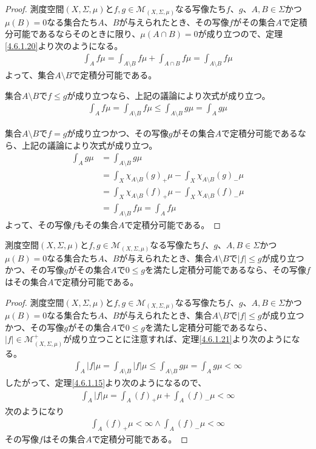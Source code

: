\documentclass[dvipdfmx]{jsarticle}
\begin{document}
\begin{proof}
測度空間$(X,\varSigma,\mu)$と$f,g \in \mathcal{M}_{(X,\varSigma,\mu)}$なる写像たち$f$、$g$、$A,B \in \varSigma$かつ$\mu(B) = 0$なる集合たち$A$、$B$が与えられたとき、その写像$f$がその集合$A$で定積分可能であるならそのときに限り、$\mu(A \cap B) = 0$が成り立つので、定理\ref{4.6.1.20}より次のようになる。
\begin{align*}
\int_{A} {f\mu} = \int_{A \setminus B} {f\mu} + \int_{A \cap B} {f\mu} = \int_{A \setminus B} {f\mu}
\end{align*}
よって、集合$A \setminus B$で定積分可能である。\par
集合$A \setminus B$で$f \leq g$が成り立つなら、上記の議論により次式が成り立つ。
\begin{align*}
\int_{A} {f\mu} = \int_{A \setminus B} {f\mu} \leq \int_{A \setminus B} {g\mu} = \int_{A} {g\mu}
\end{align*}\par
集合$A \setminus B$で$f = g$が成り立つかつ、その写像$g$がその集合$A$で定積分可能であるなら、上記の議論により次式が成り立つ。
\begin{align*}
\int_{A} {g\mu} &= \int_{A \setminus B} {g\mu}\\
&= \int_{X} {\chi_{A \setminus B}(g)_{+}\mu} - \int_{X} {\chi_{A \setminus B}(g)_{-}\mu}\\
&= \int_{X} {\chi_{A \setminus B}(f)_{+}\mu} - \int_{X} {\chi_{A \setminus B}(f)_{-}\mu}\\
&= \int_{A \setminus B} {f\mu} = \int_{A} {f\mu}
\end{align*}
よって、その写像$f$もその集合$A$で定積分可能である。
\end{proof}
\begin{thm}\label{4.6.1.22}
測度空間$(X,\varSigma,\mu)$と$f,g \in \mathcal{M}_{(X,\varSigma,\mu)}$なる写像たち$f$、$g$、$A,B \in \varSigma$かつ$\mu(B) = 0$なる集合たち$A$、$B$が与えられたとき、集合$A \setminus B$で$|f| \leq g$が成り立つかつ、その写像$g$がその集合$A$で$0 \leq g$を満たし定積分可能であるなら、その写像$f$はその集合$A$で定積分可能である。
\end{thm}
\begin{proof}
測度空間$(X,\varSigma,\mu)$と$f,g \in \mathcal{M}_{(X,\varSigma,\mu)}$なる写像たち$f$、$g$、$A,B \in \varSigma$かつ$\mu(B) = 0$なる集合たち$A$、$B$が与えられたとき、集合$A \setminus B$で$|f| \leq g$が成り立つかつ、その写像$g$がその集合$A$で$0 \leq g$を満たし定積分可能であるなら、$|f| \in \mathcal{M}_{(X,\varSigma,\mu)}^{+}$が成り立つことに注意すれば、定理\ref{4.6.1.21}より次のようになる。
\begin{align*}
\int_{A} {|f|\mu} = \int_{A \setminus B} {|f|\mu} \leq \int_{A \setminus B} {g\mu} = \int_{A} {g\mu} < \infty
\end{align*}
したがって、定理\ref{4.6.1.15}より次のようになるので、
\begin{align*}
\int_{A} {|f|\mu} = \int_{A} {(f)_{+}\mu} + \int_{A} {(f)_{-}\mu} < \infty
\end{align*}
次のようになり
\begin{align*}
\int_{A} {(f)_{+}\mu} < \infty \land \int_{A} {(f)_{-}\mu} < \infty
\end{align*}
その写像$f$はその集合$A$で定積分可能である。
\end{proof}
\end{document}
